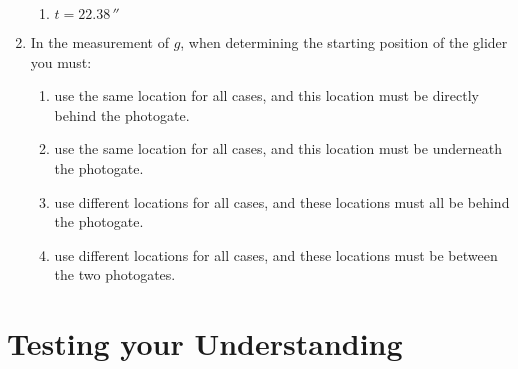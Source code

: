 \begin{enumerate}
\begin{enumerate}
  \item $t = 22.38\,\second$
  \end{enumerate}
\item  In the measurement of $g$, when determining the starting position of the glider you must:
  \begin{enumerate}
  \item use the same location for all cases, and this location must be directly behind the photogate.
  \item use the same location for all cases, and this location must be underneath the photogate.
  \item use different locations for all cases, and these locations must all be behind the photogate.
  \item use different locations for all cases, and these locations must be between the two photogates.
  \end{enumerate}
\end{enumerate}










\section{Testing your Understanding}

